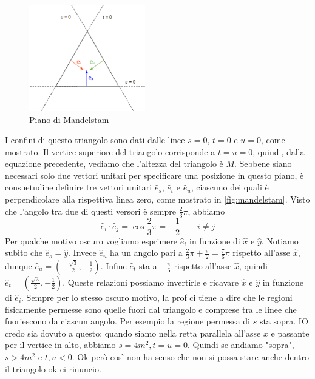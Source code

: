 \begin{itemize}
        \begin{figure}[h]
            \centering
            \includegraphics[width=0.45\textwidth]{immagini/fig_mandelstam.png}
            \caption{Piano di Mandelstam}%
            \label{fig:mandelstam}
          \end{figure}
          I confini di questo triangolo sono dati dalle linee \( s = 0 \), \( t = 0 \) e \( u = 0 \), come mostrato. Il vertice superiore del triangolo corrisponde a \( t = u = 0 \), quindi, dalla equazione precedente, vediamo che l'altezza del triangolo è \( M \). Sebbene siano necessari solo due vettori unitari per specificare una posizione in questo piano, è consuetudine definire tre vettori unitari \( \hat{e}_s \), \( \hat{e}_t \) e \( \hat{e}_u \), ciascuno dei quali è perpendicolare alla rispettiva linea zero, come mostrato in \autoref{fig:mandelstam}. Visto che l'angolo tra due di questi versori è sempre $\frac23\pi$, abbiamo 
          \begin{equation*}
          \hat{e}_i\cdot\hat{e}_j=\cos\frac23\pi=-\frac12 \qquad i\neq j
          \end{equation*}
          Per qualche motivo oscuro vogliamo esprimere ${\hat e_i}$ in funzione di $\hat x$ e $\hat y$. Notiamo subito che $\hat e_s=\hat y$. Invece $\hat e_u$ ha un angolo pari a $\frac23\pi+\frac\pi2=\frac76\pi$ rispetto all'asse $\hat x$, dunque $\hat e_u=(-\frac{\sqrt3} 2,-\frac12)$. Infine $\hat e_t$ sta a $-\frac\pi6$ rispetto all'asse $\hat x$, quindi $\hat e_t=(\frac{\sqrt3}2,-\frac12)$. Queste relazioni possiamo invertirle e ricavare $\hat x$ e $\hat y$ in funzione di $\hat e_i$. Sempre per lo stesso oscuro motivo, la prof ci tiene a dire che le regioni fisicamente permesse sono quelle fuori dal triangolo e comprese tra le linee che fuoriescono da ciascun angolo. Per esempio la regione permessa di $s$ sta sopra. IO credo sia dovuto a questo: quando siamo nella retta parallela all'asse $x$ e passante per il vertice in alto, abbiamo  $s=4m^2,t=u=0$. Quindi se andiamo "sopra", $s>4m^2$ e $t,u<0$. Ok però così non ha senso che non si possa stare anche dentro il triangolo ok ci rinuncio.
\end{itemize}